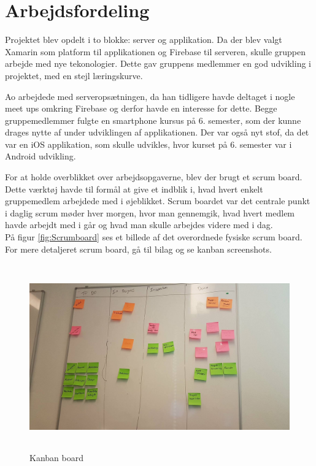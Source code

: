 \section{Arbejdsfordeling}
Projektet blev opdelt i to blokke: server og applikation. Da der blev valgt Xamarin som platform til applikationen og Firebase til serveren, skulle gruppen arbejde med nye tekonologier. Dette gav gruppens medlemmer en god udvikling i projektet, med en stejl læringskurve.

Ao arbejdede med serveropsætningen, da han tidligere havde deltaget i nogle meet ups omkring Firebase og derfor havde en interesse for dette. Begge gruppemedlemmer fulgte en smartphone kursus på 6. semester, som der kunne drages nytte af under udviklingen af applikationen. Der var også nyt stof, da det var en iOS applikation, som skulle udvikles, hvor kurset på 6. semester var i Android udvikling. \\

\clearpage

For at holde overblikket over arbejdsopgaverne, blev der brugt et scrum board. Dette værktøj havde til formål at give et indblik i, hvad hvert enkelt gruppemedlem arbejdede med i øjeblikket. Scrum boardet var det centrale punkt i daglig scrum møder hver morgen, hvor man gennemgik, hvad hvert medlem havde arbejdt med i går og hvad man skulle arbejdes videre med i dag. \\
På figur \ref{fig:Scrumboard} ses et billede af det overordnede fysiske scrum board. For mere detaljeret scrum board, gå til bilag og se kanban screenshots. \\

\begin{figure} [H]
	\begin{center}
		\includegraphics[height=8cm, width=12cm]{Arbejdsfordeling/ScrumBoard}
	\end{center}
	\caption{Kanban board}
	\label{fig:Kanbanboard}
\end{figure}


\clearpage